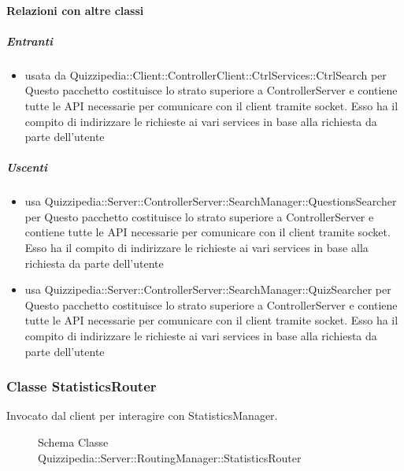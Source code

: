 \paragraph{Relazioni con altre classi}
\subparagraph{Entranti}
\begin{itemize}
\item usata da Quizzipedia::Client::ControllerClient::CtrlServices::CtrlSearch per Questo pacchetto costituisce lo strato superiore a ControllerServer e contiene tutte le API necessarie per comunicare con il client tramite socket. Esso ha il compito di indirizzare le richieste ai vari services in base alla richiesta da parte dell'utente
\end{itemize}
\subparagraph{Uscenti}
\begin{itemize}
\item usa Quizzipedia::Server::ControllerServer::SearchManager::QuestionsSearcher per Questo pacchetto costituisce lo strato superiore a ControllerServer e contiene tutte le API necessarie per comunicare con il client tramite socket. Esso ha il compito di indirizzare le richieste ai vari services in base alla richiesta da parte dell'utente
\item usa Quizzipedia::Server::ControllerServer::SearchManager::QuizSearcher per Questo pacchetto costituisce lo strato superiore a ControllerServer e contiene tutte le API necessarie per comunicare con il client tramite socket. Esso ha il compito di indirizzare le richieste ai vari services in base alla richiesta da parte dell'utente
\end{itemize}
\subsubsection{Classe StatisticsRouter}
Invocato dal client per interagire con StatisticsManager.
\begin{figure}[H]
\centering
\noindent{}
\caption[Schema Classe StatisticsRouter]{Schema Classe Quizzipedia::Server::RoutingManager::StatisticsRouter}
\end{figure}
